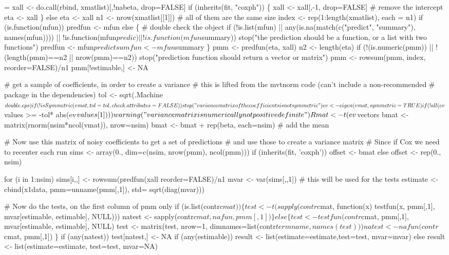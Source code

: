 \documentclass{article}
\begin{document}
\begin{nwchunk}
=
 xall <- do.call(rbind, xmatlist)[,!nabeta, drop=FALSE]
 if (inherits(fit, "coxph")) \{
     xall <- xall[,-1, drop=FALSE]  # remove the intercept
     eta <- xall %
 \}
 else eta <- xall %
 n1 <- nrow(xmatlist[[1]])  # all of them are the same size
 index <- rep(1:length(xmatlist), each = n1)
 if (is.function(mfun)) predfun <- mfun
 else \{  # double check the object
     if (!is.list(mfun) || 
         any(is.na(match(c("predict", "summary"), names(mfun)))) ||
         !is.function(mfun$predic) || !is.function(mfun$summary))
         stop("the prediction should be a function, or a list with two functions")
     predfun <- mfun$predict
     sumfun  <- mfun$summary
 \}
 pmm <- predfun(eta, xall)
 n2 <- length(eta)
 if (!(is.numeric(pmm)) || !(length(pmm)==n2 || nrow(pmm)==n2))
     stop("prediction function should return a vector or matrix")
 pmm <- rowsum(pmm, index, reorder=FALSE)/n1
 pmm[!estimable,] <- NA
 
 # get a sample of coefficients, in order to create a variance
 # this is lifted from the mvtnorm code (can't include a non-recommended
 # package in the dependencies)
 tol <- sqrt(.Machine$double.eps)
 if (!isSymmetric(vmat, tol=tol, check.attributes=FALSE))
     stop("variance matrix of the coefficients is not symmetric")
 ev <- eigen(vmat, symmetric=TRUE)
 if (!all(ev$values >= -tol* abs(ev$values[1])))
     warning("variance matrix is numerically not positive definite")
 Rmat <- t(ev$vectors %
 bmat <- matrix(rnorm(nsim*ncol(vmat)), nrow=nsim) %
 bmat <- bmat + rep(beta, each=nsim)  # add the mean
 
 # Now use this matrix of noisy coefficients to get a set of predictions
 # and use those to create a variance matrix
 # Since if Cox we need to recenter each run
 sims <- array(0., dim=c(nsim, nrow(pmm), ncol(pmm)))
 if (inherits(fit, 'coxph')) offset <- bmat %
 else offset <- rep(0., nsim)
    
 for (i in 1:nsim)
     sims[i,,] <- rowsum(predfun(xall %
                         reorder=FALSE)/n1
 mvar <- var(sims[,,1])  # this will be used for the tests
 estimate <- cbind(x1data, pmm=unname(pmm[,1]), std= sqrt(diag(mvar)))
 
 # Now do the tests, on the first column of pmm only
 if (is.list(contr$cmat)) \{
     test <- t(sapply(contr$cmat, function(x)
         testfun(x, pmm[,1], mvar[estimable, estimable], NULL)))
     natest <- sapply(contr$cmat, nafun, pmm[,1])
 \}
 else \{
     test <- testfun(contr$cmat, pmm[,1], mvar[estimable, estimable], NULL)
     test <- matrix(test, nrow=1, 
                    dimnames=list(contr$termname, names(test)))
     natest <- nafun(contr$cmat, pmm[,1])
 \}
 if (any(natest)) test[natest,] <- NA
 if (any(estimable))
     result <- list(estimate=estimate,test=test, mvar=mvar)
 else  result <- list(estimate=estimate, test=test, mvar=NA)
 

\end{nwchunk}
\end{document}
